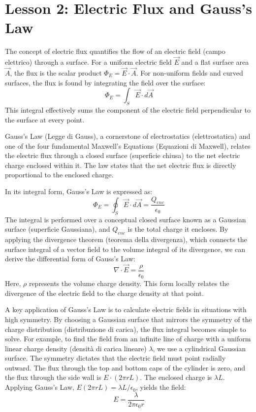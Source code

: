 \section*{Lesson 2: Electric Flux and Gauss's Law}

The concept of electric flux quantifies the flow of an electric field (campo elettrico) through a surface. For a uniform electric field $\vec{E}$ and a flat surface area $\vec{A}$, the flux is the scalar product $\Phi_E = \vec{E} \cdot \vec{A}$. For non-uniform fields and curved surfaces, the flux is found by integrating the field over the surface:
\begin{equation}
    \Phi_E = \int_S \vec{E} \cdot d\vec{A}
\end{equation}
This integral effectively sums the component of the electric field perpendicular to the surface at every point.

Gauss's Law (Legge di Gauss), a cornerstone of electrostatics (elettrostatica) and one of the four fundamental Maxwell's Equations (Equazioni di Maxwell), relates the electric flux through a closed surface (superficie chiusa) to the net electric charge enclosed within it. The law states that the net electric flux is directly proportional to the enclosed charge.

In its integral form, Gauss's Law is expressed as:
\begin{equation}
    \Phi_E = \oint_S \vec{E} \cdot d\vec{A} = \frac{Q_{enc}}{\epsilon_0}
\end{equation}
The integral is performed over a conceptual closed surface known as a Gaussian surface (superficie Gaussiana), and $Q_{enc}$ is the total charge it encloses. By applying the divergence theorem (teorema della divergenza), which connects the surface integral of a vector field to the volume integral of its divergence, we can derive the differential form of Gauss's Law:
\begin{equation}
    
\nabla \cdot \vec{E} = \frac{\rho}{\epsilon_0}
\end{equation}
Here, $\rho$ represents the volume charge density. This form locally relates the divergence of the electric field to the charge density at that point.

A key application of Gauss's Law is to calculate electric fields in situations with high symmetry. By choosing a Gaussian surface that mirrors the symmetry of the charge distribution (distribuzione di carica), the flux integral becomes simple to solve. For example, to find the field from an infinite line of charge with a uniform linear charge density (densità di carica lineare) $\lambda$, we use a cylindrical Gaussian surface. The symmetry dictates that the electric field must point radially outward. The flux through the top and bottom caps of the cylinder is zero, and the flux through the side wall is $E \cdot (2\pi r L)$. The enclosed charge is $\lambda L$. Applying Gauss's Law, $E (2\pi r L) = \lambda L / \epsilon_0$, yields the field:
\begin{equation}
    E = \frac{\lambda}{2\pi\epsilon_0 r}
\end{equation}

